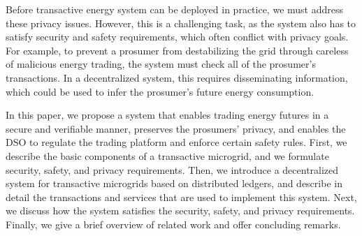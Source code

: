Before transactive energy system can be deployed in practice, we must address these privacy issues.
However, this is a challenging task, as the system also has to satisfy security and safety requirements, which often conflict with privacy goals.
For example, to prevent a prosumer from destabilizing the grid through careless of malicious energy trading, the system must check all of the prosumer's transactions.
In a decentralized system, this requires disseminating information, which could be used to infer the prosumer's future energy consumption.

In this paper, we propose a system that enables trading energy futures in a secure and verifiable manner, preserves the prosumers' privacy, and enables the DSO to regulate the trading platform and enforce certain safety rules.
First, we describe the basic components of a transactive microgrid, and we formulate security, safety, and privacy requirements. 
Then, we introduce a decentralized system for transactive microgrids based on distributed ledgers, and describe in detail the transactions and services that are used to implement this system.
Next, we discuss how the system satisfies the security, safety, and privacy requirements.
Finally, we give a brief overview of related work and offer concluding remarks.

